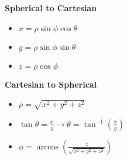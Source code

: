\documentclass[10pt]{article}                               %
\begin{document}
\begin{tcolorbox}
\begin{adjustwidth}{2em}{0pt}
\begin{adjustwidth}{2em}{0pt}
\begin{tcolorbox}[enhanced, colback=white, colframe=black, boxrule=0.5pt]
            \end{tcolorbox}

            \vspace{0.5em}

            \textbf{Spherical to Cartesian}

                \begin{itemize}
                    \item \( x = \rho\sin\phi\cos\theta \)
                    \item \( y = \rho\sin\phi\sin\theta \)
                    \item \( z = \rho\cos\phi \)
                \end{itemize}

                \vspace{0.5em}

                \textbf{Cartesian to Spherical}

                \begin{itemize}
                    \item \( \rho = \sqrt{x^2 + y^2 + z^2} \)
                    \item \( \tan\theta = \frac{x}{y}  \rightarrow  \theta = \tan^{-1}\left(\frac{x}{y}\right) \)
                    \item \( \phi = \arccos\left(\frac{z}{\sqrt{x^2 + y^2 + z^2}}\right) \)
                \end{itemize}

        \end{adjustwidth}

    \end{adjustwidth}

\end{tcolorbox}
\end{document}
